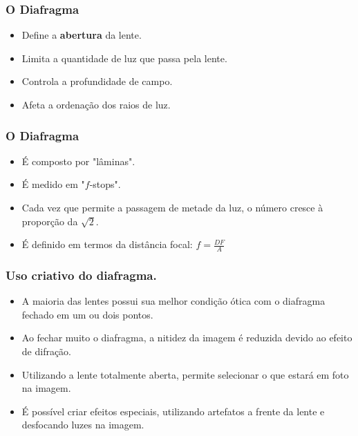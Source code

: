 



\begin{frame}
    \frametitle{O Diafragma}
    \begin{itemize}
        \item Define a \textbf{abertura} da lente.
        \item Limita a quantidade de luz que passa pela lente.
        \item Controla a profundidade de campo.
        \item Afeta a ordenação dos raios de luz.
    \end{itemize}
\end{frame}

\begin{frame}
    \frametitle{O Diafragma}
    \begin{itemize}
        \item É composto por "lâminas".
        \item É medido em "$f$-stops".
        \item Cada vez que permite a passagem de metade da luz, o número
              cresce à proporção da $\sqrt{2}$.
        \item É definido em termos da distância focal: $f=\frac{DF}{A}$
    \end{itemize}
\end{frame}





\begin{frame}
    \frametitle{Uso criativo do diafragma.}
    \begin{itemize}
        \item A maioria das lentes possui sua melhor condição ótica com o diafragma fechado em um ou dois pontos.
        \item Ao fechar muito o diafragma, a nitidez da imagem é reduzida devido ao efeito de difração.
        \item Utilizando a lente totalmente aberta, permite selecionar o que estará em foto na imagem.
        \item É possível criar efeitos especiais, utilizando artefatos a frente da lente e desfocando
        luzes na imagem.
    \end{itemize}
\end{frame}

